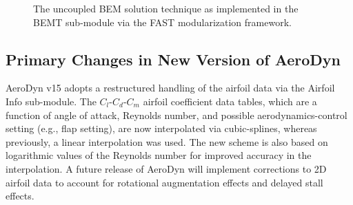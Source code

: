 \documentclass[]{aiaa-tc}%
\begin{document}
\begin{figure}[htbp]
\centering
 \qquad
 \qquad
 \caption{The uncoupled BEM solution technique as implemented in the BEMT sub-module via the FAST modularization framework.}
 \label{fig:AD_FAST}
\end{figure}


\subsection{Primary Changes in New Version of AeroDyn}
AeroDyn v15 adopts a restructured handling of the airfoil data via the Airfoil Info sub-module. The $C_l$-$C_d$-$C_m$ airfoil coefficient data tables, which are a function of angle of attack, Reynolds number, and possible aerodynamics-control setting (e.g., flap setting), are now interpolated via cubic-splines, whereas previously, a linear interpolation was used. The new scheme is also based on logarithmic values of the Reynolds number for improved accuracy in the interpolation.  A future release of AeroDyn will implement corrections to 2D airfoil data to account for rotational augmentation effects and delayed stall effects.
\end{document}
